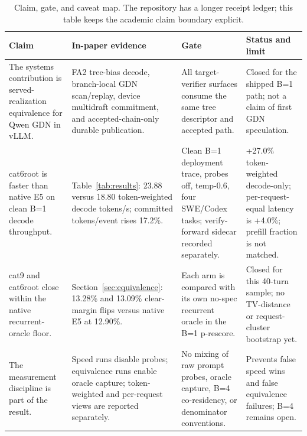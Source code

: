 \documentclass[conference]{IEEEtran}
\newcommand{\rowsep}{\specialrule{0.15pt}{1.2pt}{1.2pt}}
\begin{document}
\begin{table}[t]
\caption{Claim, gate, and caveat map. The repository has a longer receipt ledger; this table keeps the academic claim boundary explicit.}
\label{tab:claims}
\centering
\scriptsize
\begin{adjustbox}{width=\textwidth}
\begin{tabular}{L{0.24\textwidth} L{0.26\textwidth} L{0.25\textwidth} L{0.17\textwidth}}
\toprule
Claim & In-paper evidence & Gate & Status and limit \\
\midrule
The systems contribution is served-realization equivalence for Qwen GDN in vLLM. & FA2 tree-bias decode, branch-local GDN scan/replay, device multidraft commitment, and accepted-chain-only durable publication. & All target-verifier surfaces consume the same tree descriptor and accepted path. & Closed for the shipped B=1 path; not a claim of first GDN speculation. \\
\rowsep
cat6root is faster than native E5 on clean B=1 decode throughput. & Table~\ref{tab:results}: 23.88 versus 18.80 token-weighted decode tokens/s; committed tokens/event rises 17.2\%. & Clean B=1 deployment trace, probes off, temp-0.6, four SWE/Codex tasks; verify-forward sidecar recorded separately. & +27.0\% token-weighted decode-only; per-request-equal latency is +4.0\%; prefill fraction is not matched. \\
\rowsep
cat9 and cat6root close within the native recurrent-oracle floor. & Section~\ref{sec:equivalence}: 13.28\% and 13.09\% clear-margin flips versus native E5 at 12.90\%. & Each arm is compared with its own no-spec recurrent oracle in the B=1 p-rescore. & Closed for this 40-turn sample; no TV-distance or request-cluster bootstrap yet. \\
\rowsep
The measurement discipline is part of the result. & Speed runs disable probes; equivalence runs enable oracle capture; token-weighted and per-request views are reported separately. & No mixing of raw prompt probes, oracle capture, B=4 co-residency, or denominator conventions. & Prevents false speed wins and false equivalence failures; B=4 remains open. \\
\bottomrule
\end{tabular}
\end{adjustbox}
\end{table}
\end{document}
